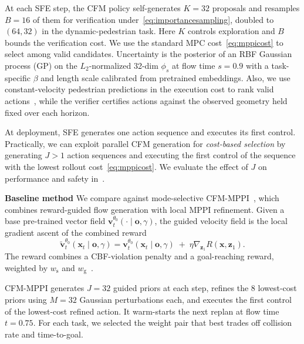 \documentclass[letterpaper, 10 pt, conference]{ieeeconf}
\begin{document}
At each SFE step, the CFM policy self-generates $K=32$ proposals and resamples $B=16$ of them for verification under~\eqref{eq:importancesampling}, doubled to \((64,32)\) in the dynamic-pedestrian task. Here $K$ controls exploration and $B$ bounds the verification cost. We use the standard MPC cost~\eqref{eq:mppicost} to select among valid candidates. Uncertainty is the posterior of an RBF Gaussian process (GP) on the $L_2$-normalized 32-dim $\phi_s$ at flow time $s=0.9$ with a task-specific $\beta$ and length scale calibrated from pretrained embeddings. Also, we use constant-velocity pedestrian predictions in the execution cost to rank valid actions~\cite{mizuta2025unified}, while the verifier certifies actions against the observed geometry held fixed over each horizon.

At deployment, SFE generates one action sequence and executes its first control. Practically, we can exploit parallel CFM generation for \emph{cost-based selection} by generating $J>1$ action sequences and executing the first control of the sequence with the lowest rollout cost~\eqref{eq:mppicost}. We evaluate the effect of $J$ on performance and safety in~. 

\noindent \textbf{Baseline method} We compare against mode-selective CFM-MPPI~\cite{mizuta2025unified}, which combines reward-guided flow generation with local MPPI refinement.  Given a base pre-trained vector field $\mathbf{v}_t^{\theta_{\text{0}}}(\cdot\!\mid\! \mathbf{o},\gamma)$, the guided velocity field is the local gradient ascent of the combined reward
\begin{equation}
   \tilde{\mathbf{v}}_t^{\theta_{\text{0}}}(\mathbf{x}_t\!\mid\! \mathbf{o},\gamma)  = \mathbf{v}_t^{\theta_{\text{0}}}(\mathbf{x}_t\!\mid\! \mathbf{o},\gamma) \;+\; \eta \nabla_{\mathbf{z}_1}R(\mathbf{x},\mathbf{z}_1).
   \label{eq:cfm-mppi_vectorfield}
\end{equation}
The reward combines a CBF-violation penalty and a goal-reaching reward, weighted by $w_\mathrm{s}$ and $w_\mathrm{g}$~\cite[Eq. 6--7]{mizuta2025unified}.

CFM-MPPI generates $J=32$ guided priors at each step, refines the $8$ lowest-cost priors using $M=32$ Gaussian perturbations each, and executes the first control of the lowest-cost refined action. It warm-starts the next replan at flow time $t=0.75$. For each task, we selected the weight pair that best trades off collision rate and time-to-goal.
\end{document}
